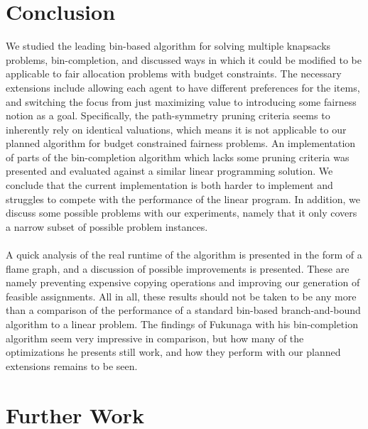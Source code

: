 \documentclass[b5paper]{article}
\begin{document}
\section{Conclusion}
We studied the leading bin-based algorithm for solving multiple knapsacks problems, bin-completion, and discussed ways in which it could be modified to be applicable to fair allocation problems with budget constraints.
The necessary extensions include allowing each agent to have different preferences for the items, and switching the focus from just maximizing value to introducing some fairness notion as a goal.
Specifically, the path-symmetry pruning criteria seems to inherently rely on identical valuations, which means it is not applicable to our planned algorithm for budget constrained fairness problems.
An implementation of parts of the bin-completion algorithm which lacks some pruning criteria was presented and evaluated against a similar linear programming solution.
We conclude that the current implementation is both harder to implement and struggles to compete with the performance of the linear program.
In addition, we discuss some possible problems with our experiments, namely that it only covers a narrow subset of possible problem instances. 
\\ \\
A quick analysis of the real runtime of the algorithm is presented in the form of a flame graph, and a discussion of possible improvements is presented.
These are namely preventing expensive copying operations and improving our generation of feasible assignments.
All in all, these results should not be taken to be any more than a comparison of the performance of a standard bin-based branch-and-bound algorithm to a linear problem.
The findings of Fukunaga with his bin-completion algorithm \cite{fukunaga_branch-and-bound_2011} seem very impressive in comparison,
but how many of the optimizations he presents still work, and how they perform with our planned extensions remains to be seen.

\section{Further Work}
\end{document}
